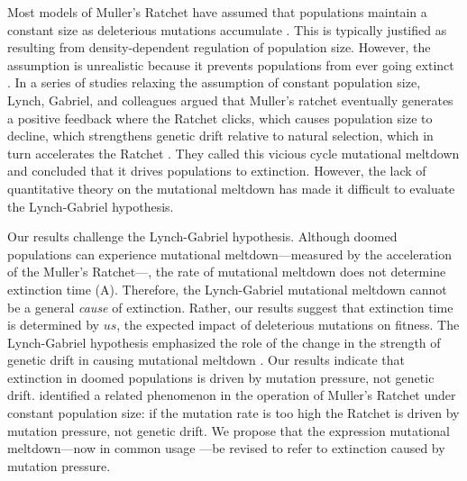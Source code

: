 \documentclass[9pt,lineno]{elife}
\begin{document}
Most models of Muller's Ratchet have assumed that populations maintain a constant size as deleterious mutations accumulate \citep{Haigh_The_1978, Gessler_The_1995, Gordo_On_2000, gor00b, Rouzine_The_2003, met13}.
This is typically justified as resulting from density-dependent regulation of population size.  
However, the assumption is unrealistic because it prevents populations from ever going extinct \citep{Lynch_MUTATION_1990, mel91}.  
%
In a series of studies relaxing the assumption of constant population size, Lynch, Gabriel, and colleagues argued that Muller's ratchet eventually generates a positive feedback where
the Ratchet clicks, 
which causes population size to decline, 
which strengthens genetic drift relative to natural selection,
which in turn accelerates the Ratchet \citep{Lynch_MUTATION_1990, lyn93, Gabriel_MULLER_1993}.  
They called this vicious cycle mutational meltdown and concluded that it drives populations to extinction.  
However, the lack of quantitative theory on the mutational meltdown has made it difficult to evaluate the Lynch-Gabriel hypothesis.

Our results challenge the Lynch-Gabriel hypothesis.  Although doomed populations can experience mutational meltdown---measured by the acceleration of the Muller's Ratchet---, the rate of mutational meltdown does not determine extinction time (A).  Therefore, the Lynch-Gabriel mutational meltdown cannot be a general \textit{cause} of extinction.  Rather, our results suggest that extinction time is determined by $us$, the expected impact of deleterious mutations on fitness.  
%
The Lynch-Gabriel hypothesis emphasized the role of the change in the strength of genetic drift in causing mutational meltdown \citep[e.g., ``we refer to this synergism between mutation accumulation and random genetic drift as a mutational meltdown'';][]{lyn93}.  
Our results indicate that extinction in doomed populations is driven by mutation pressure, not genetic drift.  
%
\citet{Gessler_The_1995}  identified a related phenomenon in the operation of Muller's Ratchet under constant population size: if the mutation rate is too high the Ratchet is driven by mutation pressure, not genetic drift.
%
We propose that the expression mutational meltdown---now in common usage \citep[e.g.,][]{Allen_Mutational_2009, McFarland_Tug_2014}---be revised to refer to extinction caused by mutation pressure.
\end{document}
